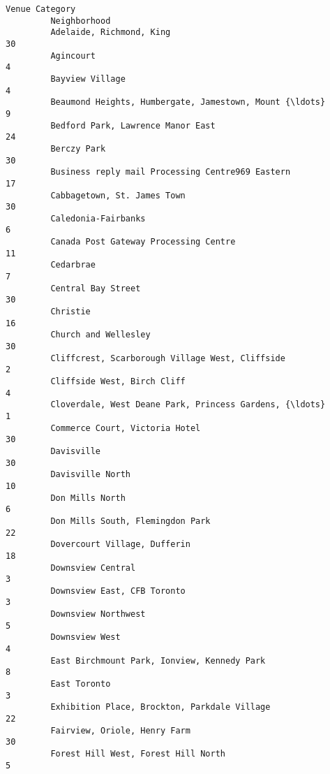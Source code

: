\documentclass[11pt]{article}
\begin{document}
\begin{Verbatim}[commandchars=\\\{\}]
                                                             Venue Category  
         Neighborhood                                                        
         Adelaide, Richmond, King                                        30  
         Agincourt                                                        4  
         Bayview Village                                                  4  
         Beaumond Heights, Humbergate, Jamestown, Mount {\ldots}               9  
         Bedford Park, Lawrence Manor East                               24  
         Berczy Park                                                     30  
         Business reply mail Processing Centre969 Eastern                17  
         Cabbagetown, St. James Town                                     30  
         Caledonia-Fairbanks                                              6  
         Canada Post Gateway Processing Centre                           11  
         Cedarbrae                                                        7  
         Central Bay Street                                              30  
         Christie                                                        16  
         Church and Wellesley                                            30  
         Cliffcrest, Scarborough Village West, Cliffside                  2  
         Cliffside West, Birch Cliff                                      4  
         Cloverdale, West Deane Park, Princess Gardens, {\ldots}               1  
         Commerce Court, Victoria Hotel                                  30  
         Davisville                                                      30  
         Davisville North                                                10  
         Don Mills North                                                  6  
         Don Mills South, Flemingdon Park                                22  
         Dovercourt Village, Dufferin                                    18  
         Downsview Central                                                3  
         Downsview East, CFB Toronto                                      3  
         Downsview Northwest                                              5  
         Downsview West                                                   4  
         East Birchmount Park, Ionview, Kennedy Park                      8  
         East Toronto                                                     3  
         Exhibition Place, Brockton, Parkdale Village                    22  
         Fairview, Oriole, Henry Farm                                    30  
         Forest Hill West, Forest Hill North                              5  

\end{Verbatim}
\end{document}
